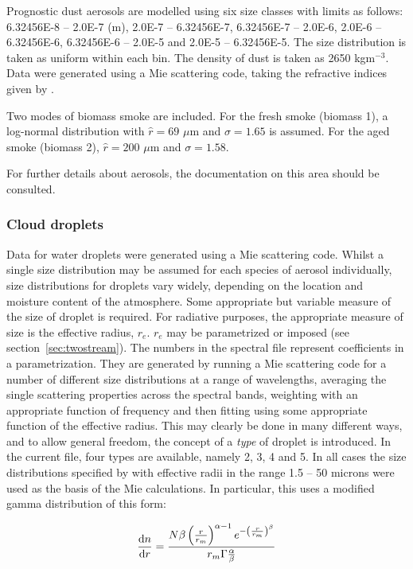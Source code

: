 Prognostic dust aerosols are modelled using six size classes with limits as
follows: 6.32456E-8 -- 2.0E-7 (m), 2.0E-7 -- 6.32456E-7, 
6.32456E-7 -- 2.0E-6, 2.0E-6 -- 6.32456E-6, 6.32456E-6 -- 2.0E-5 and
2.0E-5 -- 6.32456E-5. The size distribution is taken as uniform within
each bin. The density of dust is taken as 2650 kgm${}^{-3}$. Data were
generated using a Mie scattering code, taking the refractive indices
given by \citet{Deepak83}.

Two modes of biomass smoke are included. For the fresh smoke (biomass 1),
a log-normal distribution with $\hat r=69$ $\mu$m and $\sigma=1.65$ is
assumed. For the aged smoke (biomass 2), $\hat r=200$ $\mu$m and $\sigma=1.58$.

For further details about aerosols, the documentation on this area should
be consulted.

\subsubsection*{Cloud droplets}

Data for water droplets were generated using a Mie scattering code. 
Whilst a single size distribution may be assumed for each species
of aerosol individually, size distributions for droplets vary widely,
depending on the location and moisture content of the atmosphere. Some
appropriate but variable measure of the size of droplet is required.
For radiative purposes, the
appropriate measure of size is the effective radius, $r_e$. $r_e$
may be parametrized or imposed (see section~\ref{sec:twostream}).
The numbers in the
spectral file represent coefficients in a parametrization. They
are generated by running a Mie scattering code for a number of different
size distributions at a range of wavelengths, averaging the single
scattering properties across the spectral bands, weighting with an
appropriate function of frequency and then fitting using some appropriate
function of the effective radius. This may clearly be done in many
different ways, and to allow general freedom, the concept of a {\em
type} of droplet is introduced. In the current file, four types are available,
namely 2, 3, 4 and 5. In all cases the size distributions specified by 
\citet{Rockel91} with effective
radii in the range 1.5 -- 50 microns were used as the 
basis of the Mie calculations. In particular, this uses a modified gamma distribution of this form:

\begin{equation}
\frac{{\rm d}n}{{\rm d}r} = \frac{N \beta \left(\frac{r}{r_m}\right)^{\alpha-1} e^{-\left(\frac{r}{r_m}\right)^{\beta}}}{r_m \Gamma \frac{\alpha}{\beta}}
\end{equation}

